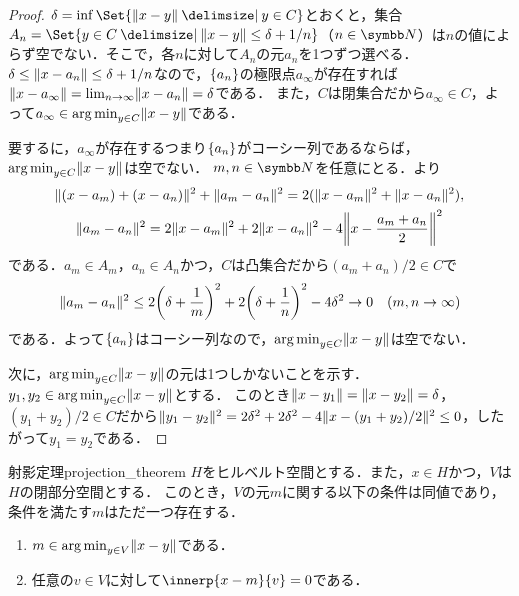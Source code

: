 \documentclass[../../main]{subfiles}
\begin{document}
\begin{proof}
  \(\delta=\inf\Set{\vnorm{x-y}\given y\in C}\)とおくと，集合\(A_n=\Set{y\in C\given\vnorm{x-y}\leq\delta+1/n}\)（\(n\in\numset{N}\)）は\(n\)の値によらず空でない．そこで，各\(n\)に対して\(A_n\)の元\(a_n\)を1つずつ選べる．
  \(\delta\leq\lVert x-a_n\rVert\leq\delta+1/n\)なので，\(\lbrace a_n\rbrace\)の極限点\(a_\infty\)が存在すれば\(\lVert x-a_\infty\rVert=\lim_{n\to\infty}\lVert x-a_n\rVert=\delta\)である．
  また，\(C\)は閉集合だから\(a_\infty\in C\)，よって\(a_\infty\in\operatorname*{arg\,min}_{y\in C}\lVert x-y\rVert\)である．

  要するに，\(a_\infty\)が存在する\texttwoemdash つまり\(\lbrace a_n\rbrace\)がコーシー列である\texttwoemdash ならば，\(\operatorname*{arg\,min}_{y\in C}\lVert x-y\rVert\)は空でない．
  \(m,n\in\numset{N}\)を任意にとる．より
  \begin{gather*}
    \vnorm{(x-a_m)+(x-a_n)}^2+\vnorm{a_m-a_n}^2 = 2(\vnorm{x-a_m}^2+\vnorm{x-a_n}^2), \\
    \vnorm{a_m-a_n}^2 = 2\vnorm{x-a_m}^2+2\vnorm{x-a_n}^2-4\vnorm*{x-\frac{a_m+a_n}{2}}^2
  \end{gather*}
  である．\(a_m\in A_m\)，\(a_n\in A_n\)かつ，\(C\)は凸集合だから\((a_m+a_n)/2\in C\)で
  \[
    \vnorm{a_m-a_n}^2 \leq 2\pqty*{\delta+\frac{1}{m}}^2+2\pqty*{\delta+\frac{1}{n}}^2-4\delta^2
    \to 0\quad(m,n\to\infty)
  \]
  である．よって\(\lbrace a_n\rbrace\)はコーシー列なので，\(\operatorname*{arg\,min}_{y\in C}\lVert x-y\rVert\)は空でない．

  次に，\(\operatorname*{arg\,min}_{y\in C}\lVert x-y\rVert\)の元は1つしかないことを示す．\(y_1,y_2\in\operatorname*{arg\,min}_{y\in C}\lVert x-y\rVert\)とする．
  このとき\(\lVert x-y_1\rVert=\lVert x-y_2\rVert=\delta\)，\((y_1+y_2)/2\in C\)だから\(\lVert y_1-y_2\rVert^2=2\delta^2+2\delta^2-4\lVert x-(y_1+y_2)/2\rVert^2\leq 0\)，したがって\(y_1=y_2\)である．
\end{proof}

\begin{theorem}{射影定理}{projection_theorem}
  \(H\)をヒルベルト空間とする．また，\(x\in H\)かつ，\(V\)は\(H\)の閉部分空間とする．
  このとき，\(V\)の元\(m\)に関する以下の条件は同値であり，条件を満たす\(m\)はただ一つ存在する．
  \begin{enumerate}
    \item \(m\in\operatorname*{arg\,min}_{y\in V}\lVert x-y\rVert\)である．
    \item 任意の\(v\in V\)に対して\(\innerp{x-m}{v}=0\)である．
  \end{enumerate}
\end{theorem}
\end{document}
